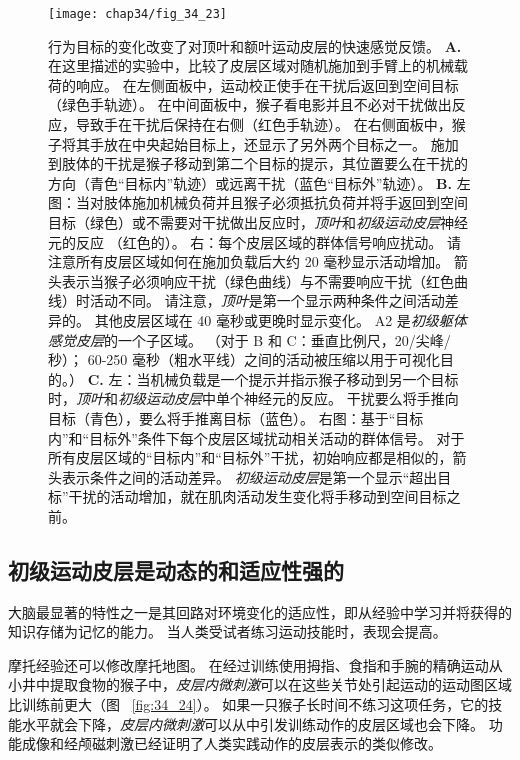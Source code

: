 \begin{figure}[htbp]
	\centering
	\texttt{[image: chap34/fig\_34\_23]}
	\caption{行为目标的变化改变了对顶叶和额叶运动皮层的快速感觉反馈。
		\textbf{A.} 在这里描述的实验中，比较了皮层区域对随机施加到手臂上的机械载荷的响应。
		在左侧面板中，运动校正使手在干扰后返回到空间目标（绿色手轨迹）。
		在中间面板中，猴子看电影并且不必对干扰做出反应，导致手在干扰后保持在右侧（红色手轨迹）。
		在右侧面板中，猴子将其手放在中央起始目标上，还显示了另外两个目标之一。
		施加到肢体的干扰是猴子移动到第二个目标的提示，其位置要么在干扰的方向（青色“目标内”轨迹）或远离干扰（蓝色“目标外”轨迹）。
		\textbf{B.} 左图：当对肢体施加机械负荷并且猴子必须抵抗负荷并将手返回到空间目标（绿色）或不需要对干扰做出反应时，\textit{顶叶}和\textit{初级运动皮层}神经元的反应 （红色的）。
		右：每个皮层区域的群体信号响应扰动。 请注意所有皮层区域如何在施加负载后大约 20 毫秒显示活动增加。
		箭头表示当猴子必须响应干扰（绿色曲线）与不需要响应干扰（红色曲线）时活动不同。
		请注意，\textit{顶叶}是第一个显示两种条件之间活动差异的。 
		其他皮层区域在 40 毫秒或更晚时显示变化。
		A2 是\textit{初级躯体感觉皮层}的一个子区域。 （对于 B 和 C：垂直比例尺，20/尖峰/秒）；
		60-250 毫秒（粗水平线）之间的活动被压缩以用于可视化目的。）
		\textbf{C.} 左：当机械负载是一个提示并指示猴子移动到另一个目标时，\textit{顶叶}和\textit{初级运动皮层}中单个神经元的反应。
		干扰要么将手推向目标（青色），要么将手推离目标（蓝色）。
		右图：基于“目标内”和“目标外”条件下每个皮层区域扰动相关活动的群体信号。
		对于所有皮层区域的“目标内”和“目标外”干扰，初始响应都是相似的，箭头表示条件之间的活动差异。
		\textit{初级运动皮层}是第一个显示“超出目标”干扰的活动增加，就在肌肉活动发生变化将手移动到空间目标之前。}
	\label{fig:34_23}
\end{figure}


\subsection{初级运动皮层是动态的和适应性强的}

大脑最显著的特性之一是其回路对环境变化的适应性，即从经验中学习并将获得的知识存储为记忆的能力。
当人类受试者练习运动技能时，表现会提高。


摩托经验还可以修改摩托地图。
在经过训练使用拇指、食指和手腕的精确运动从小井中提取食物的猴子中，\textit{皮层内微刺激}可以在这些关节处引起运动的运动图区域比训练前更大（图 ~\ref{fig:34_24}）。
如果一只猴子长时间不练习这项任务，它的技能水平就会下降，\textit{皮层内微刺激}可以从中引发训练动作的皮层区域也会下降。
功能成像和经颅磁刺激已经证明了人类实践动作的皮层表示的类似修改。


